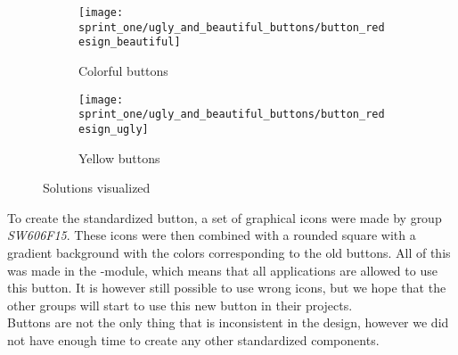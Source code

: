 \begin{figure}[!htbp]
    \centering

    \begin{subfigure}[t]{0.3\textwidth}
    	\centering
        \texttt{[image: sprint\_one/ugly\_and\_beautiful\_buttons/button\_redesign\_beautiful]}
        \caption{Colorful buttons}
        \label{fig:ugly_and_beautiful_buttons_example_one}
    \end{subfigure}
    \hspace{5em} 
    \begin{subfigure}[t]{0.3\textwidth}
    	\centering
        \texttt{[image: sprint\_one/ugly\_and\_beautiful\_buttons/button\_redesign\_ugly]}
        \caption{Yellow buttons}
        \label{fig:ugly_and_beautiful_buttons_example_two}
    \end{subfigure}
    
    \caption{Solutions visualized}
    \label{fig:ugly_and_beautiful_buttons_example_solution}
\end{figure}

To create the standardized button, a set of graphical icons were made by group \emph{SW606F15}. These icons were then combined with a rounded square with a gradient background with the colors corresponding to the old buttons. All of this was made in the -module, which means that all applications are allowed to use this button. It is however still possible to use wrong icons, but we hope that the other groups will start to use this new button in their projects. \\

Buttons are not the only thing that is inconsistent in the design, however we did not have enough time to create any other standardized components. \\

